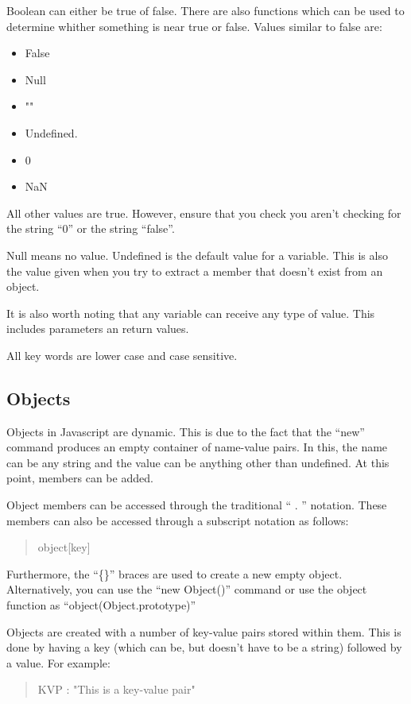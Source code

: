 			Boolean can either be true of false. 
			There are also functions which can be used to determine whither something is near true or false. 
			Values similar to false are:
			\begin{itemize}
				\item False
				\item Null
				\item ""
				\item Undefined. 
				\item 0
				\item NaN
			\end{itemize}
			All other values are true. 
			However, ensure that you check you aren't checking for the string ``0'' or the string ``false''. 

			Null means no value. 
			Undefined is the default value for a variable. 
			This is also the value given when you try to extract a member that doesn't exist from an object. 
			
			It is also worth noting that any variable can receive any type of value. 
			This includes parameters an return values. 
			
			All key words are lower case and case sensitive. 
		\subsection{Objects}
			Objects in Javascript are dynamic. 
			This is due to the fact that the ``new'' command produces an empty container of name-value pairs.
			In this, the name can be any string and the value can be anything other than undefined. 
			At this point, members can be added. 
			
			Object members can be accessed through the traditional `` . '' notation. 
			These members can also be accessed through a subscript notation as follows:
			\begin{quote}
				object[key]
			\end{quote}
			Furthermore, the ``\{\}'' braces are used to create a new empty object. 
			Alternatively, you can use the ``new Object()'' command or 
			use the object function as ``object(Object.prototype)''

			Objects are created with a number of key-value pairs stored within them. 
			This is done by having a key (which can be, but doesn't have to be a string) followed by a value. 
			For example:
			\begin{quote}
				KVP : "This is a key-value pair"
			\end{quote}
			 
